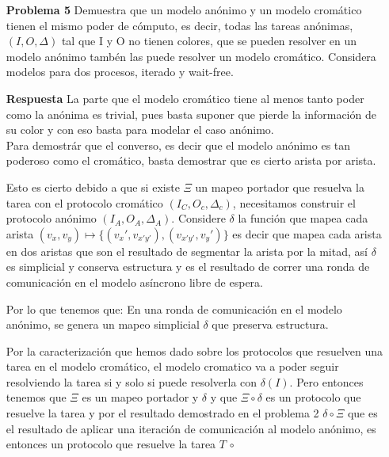 \documentclass{article}
\begin{document}
\begin{enumerate}
\item[\bf{Problema 5}] Demuestra que un modelo anónimo y un modelo cromático tienen el mismo poder de cómputo, es decir, todas las tareas anónimas, $(I, O, \Delta)$ tal que
I y O no tienen colores, que se pueden resolver en un modelo anónimo tambén las puede resolver un modelo cromático.
Considera modelos para dos procesos, iterado y wait-free.

\item[\bf{Respuesta}] La parte que el modelo cromático tiene al menos tanto poder como la anónima es trivial, pues basta suponer que pierde la información de su color y con eso basta para modelar el caso anónimo.\\

Para demostrár que el converso, es decir que el modelo anónimo es tan poderoso como el cromático, basta demostrar que es cierto arista por arista.

Esto es cierto debido a que si existe $\Xi$ un mapeo portador que resuelva la tarea con el protocolo cromático $(I_C, O_c, \Delta_c)$, necesitamos construir el protocolo anónimo $(I_A, O_A, \Delta_A)$. 
Considere $\delta$ la función que mapea cada arista $(v_x,v_y) \mapsto \{(v_x',v_{x'y'}),(v_{x'y'},v_y')\}$ es decir que mapea cada arista en dos aristas que son el resultado de segmentar la arista por la mitad, así $\delta$ es simplicial y conserva estructura y es el resultado de correr una ronda de comunicación en el modelo asíncrono libre de espera.

Por lo que tenemos que: En una ronda de comunicación en el modelo anónimo, se genera un mapeo simplicial $\delta$ que preserva estructura.

Por la caracterización que hemos dado sobre los protocolos que resuelven una tarea en el modelo cromático, el modelo cromatico va a poder seguir resolviendo la tarea si y solo si puede resolverla con $\delta(I)$. Pero entonces tenemos que $\Xi$ es un mapeo portador y $\delta$ y que $\Xi \circ \delta$ es un protocolo que resuelve la tarea y por el resultado demostrado en el problema 2 $\delta \circ \Xi$ que es el resultado de aplicar una iteración de comunicación al modelo anónimo, es entonces un protocolo que resuelve la tarea $T$ $\circ$

\end{enumerate}
\end{document}
